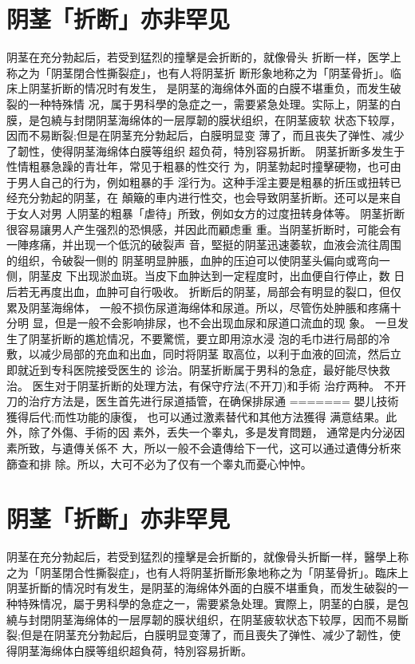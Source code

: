\documentclass[12pt,UTF8]{ctexbook}
\begin{document}
\section{阴茎「折断」亦非罕见}
阴茎在充分勃起后，若受到猛烈的撞擊是会折断的，就像骨头
折断一样，医学上称之为「阴茎閉合性撕裂症」，也有人将阴茎折
断形象地称之为「阴茎骨折」。临床上阴茎折断的情况时有发生，
是阴茎的海绵体外面的白膜不堪重负，而发生破裂的一种特殊情
况，属于男科學的急症之一，需要紧急处理。实际上，阴茎的白
膜，是包繞与封閉阴茎海绵体的一层厚韌的膜状组织，在阴茎疲软
状态下较厚，因而不易断裂;但是在阴茎充分勃起后，白膜明显变
薄了，而且丧失了弹性、减少了韌性，使得阴茎海绵体白膜等组织
超负荷，特別容易折断。
阴茎折断多发生于性情粗暴急躁的青壮年，常见于粗暴的性交行
为，阴茎勃起时撞擊硬物，也可由于男人自己的行为，例如粗暴的手
淫行为。这种手淫主要是粗暴的折压或扭转已经充分勃起的阴茎，在
顛簸的車内进行性交，也会导致阴茎折断。还可以是来自于女人对男
人阴茎的粗暴「虐待」所致，例如女方的过度扭转身体等。
阴茎折断很容易讓男人产生强烈的恐惧感，并因此而顧虑重
重。当阴茎折断时，可能会有一陣疼痛，并出现一个低沉的破裂声
音，堅挺的阴茎迅速萎软，血液会流往周围的组织，令破裂一侧的
阴茎明显肿脹，血肿的压迫可以使阴茎头偏向或弯向一侧，阴茎皮
下出现淤血斑。当皮下血肿达到一定程度时，出血便自行停止，数
日后若无再度出血，血肿可自行吸收。
折断后的阴茎，局部会有明显的裂口，但仅累及阴茎海绵体，
一般不损伤尿道海绵体和尿道。所以，尽管伤处肿脹和疼痛十分明
显，但是一般不会影响排尿，也不会出现血尿和尿道口流血的现
象。
一旦发生了阴茎折断的尷尬情况，不要驚慌，要立即用涼水浸
泡的毛巾进行局部的冷敷，以减少局部的充血和出血，同时将阴茎
取高位，以利于血液的回流，然后立即就近到专科医院接受医生的
诊治。阴茎折断属于男科的急症，最好能尽快救治。
医生对于阴茎折断的处理方法，有保守疗法(不开刀)和手術
治疗两种。
不开刀的治疗方法是，医生首先进行尿道插管，在确保排尿通
=======
嬰儿技術獲得后代;而性功能的康復，
也可以通过激素替代和其他方法獲得
满意结果。此外，除了外傷、手術的因
素外，丢失一个睾丸，多是发育問題，
通常是内分泌因素所致，与遺傳关係不
大，所以一般不会遺傳给下一代，这可以通过遺傳分析來篩查和排
除。所以，大可不必为了仅有一个睾丸而憂心忡忡。

\section{阴茎「折斷」亦非罕見}

阴茎在充分勃起后，若受到猛烈的撞擊是会折斷的，就像骨头折斷一样，醫學上称之为「阴茎閉合性撕裂症」，也有人将阴茎折斷形象地称之为「阴茎骨折」。臨床上阴茎折斷的情况时有发生，是阴茎的海绵体外面的白膜不堪重負，而发生破裂的一种特殊情况，屬于男科學的急症之一，需要紧急处理。實際上，阴茎的白膜，是包繞与封閉阴茎海绵体的一层厚韌的膜状组织，在阴茎疲软状态下较厚，因而不易斷裂;但是在阴茎充分勃起后，白膜明显变薄了，而且喪失了弹性、减少了韌性，使得阴茎海绵体白膜等组织超負荷，特別容易折断。
\end{document}
